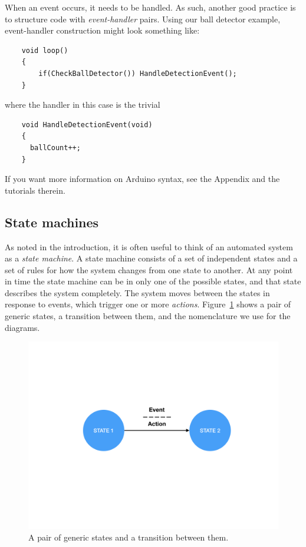 \documentclass[11pt]{article} %
\begin{document}
When an event occurs, it needs to be handled. As such, another good practice is to structure code with \emph{event-handler} pairs. Using our ball detector example, event-handler construction might look something like:

\begin{verbatim}
    void loop()
    {
        if(CheckBallDetector()) HandleDetectionEvent();
    }
\end{verbatim}

where the handler in this case is the trivial

\begin{verbatim}
    void HandleDetectionEvent(void)
    {
      ballCount++;
    }
\end{verbatim}

If you want more information on Arduino syntax, see the Appendix and the tutorials therein.

\subsection*{State machines}

As noted in the introduction, it is often useful to think of an automated system as a \emph{state machine}. A state machine consists of a set of independent states and a set of rules for how the system changes from one state to another. At any point in time the state machine can be in only one of the possible states, and that state describes the system completely. The system moves between the states in response to events, which trigger one or more \emph{actions}. Figure~\ref{fig:state.machine} shows a pair of generic states, a transition between them, and the nomenclature we use for the diagrams.

\begin{figure}[htbp]
\centering
\includegraphics[trim=2in 3in 2in 3in,clip,width=5in]{figures/generic-states.png}
\caption{A pair of generic states and a transition between them.}
\label{fig:state.machine}
\end{figure}
\end{document}
